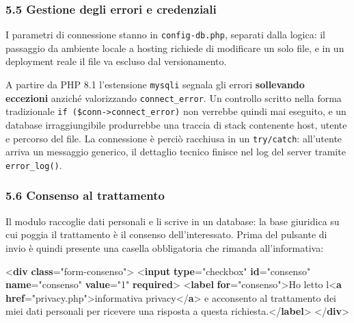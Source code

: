 \documentclass[
  11pt,
]{article}
\newenvironment{Shaded}{\begin{snugshade}}{\end{snugshade}}
\newcommand{\DataTypeTok}[1]{\textcolor[rgb]{0.13,0.29,0.53}{#1}}
\newcommand{\ErrorTok}[1]{\textcolor[rgb]{0.64,0.00,0.00}{\textbf{#1}}}
\newcommand{\KeywordTok}[1]{\textcolor[rgb]{0.13,0.29,0.53}{\textbf{#1}}}
\newcommand{\NormalTok}[1]{#1}
\newcommand{\OtherTok}[1]{\textcolor[rgb]{0.56,0.35,0.01}{#1}}
\newcommand{\StringTok}[1]{\textcolor[rgb]{0.31,0.60,0.02}{#1}}
\begin{document}
\hypertarget{gestione-degli-errori-e-credenziali}{%
\subsubsection{5.5 Gestione degli errori e
credenziali}\label{gestione-degli-errori-e-credenziali}}

I parametri di connessione stanno in \texttt{config-db.php}, separati
dalla logica: il passaggio da ambiente locale a hosting richiede di
modificare un solo file, e in un deployment reale il file va escluso dal
versionamento.

A partire da PHP 8.1 l'estensione \texttt{mysqli} segnala gli errori
\textbf{sollevando eccezioni} anziché valorizzando
\texttt{connect\_error}. Un controllo scritto nella forma tradizionale
\texttt{if\ (\$conn-\textgreater{}connect\_error)} non verrebbe quindi
mai eseguito, e un database irraggiungibile produrrebbe una traccia di
stack contenente host, utente e percorso del file. La connessione è
perciò racchiusa in un \texttt{try/catch}: all'utente arriva un
messaggio generico, il dettaglio tecnico finisce nel log del server
tramite \texttt{error\_log()}.

\hypertarget{consenso-al-trattamento}{%
\subsubsection{5.6 Consenso al
trattamento}\label{consenso-al-trattamento}}

Il modulo raccoglie dati personali e li scrive in un database: la base
giuridica su cui poggia il trattamento è il consenso dell'interessato.
Prima del pulsante di invio è quindi presente una casella obbligatoria
che rimanda all'informativa:

\begin{Shaded}
\begin{Highlighting}[]
\DataTypeTok{\textless{}}\KeywordTok{div} \ErrorTok{class}\OtherTok{=}\StringTok{"form{-}consenso"}\DataTypeTok{\textgreater{}}
  \DataTypeTok{\textless{}}\KeywordTok{input} \ErrorTok{type}\OtherTok{=}\StringTok{"checkbox"} \ErrorTok{id}\OtherTok{=}\StringTok{"consenso"} \ErrorTok{name}\OtherTok{=}\StringTok{"consenso"} \ErrorTok{value}\OtherTok{=}\StringTok{"1"} \ErrorTok{required}\DataTypeTok{\textgreater{}}
  \DataTypeTok{\textless{}}\KeywordTok{label} \ErrorTok{for}\OtherTok{=}\StringTok{"consenso"}\DataTypeTok{\textgreater{}}\NormalTok{Ho letto l\textquotesingle{}}\DataTypeTok{\textless{}}\KeywordTok{a} \ErrorTok{href}\OtherTok{=}\StringTok{"privacy.php"}\DataTypeTok{\textgreater{}}\NormalTok{informativa}
\NormalTok{    privacy}\DataTypeTok{\textless{}/}\KeywordTok{a}\DataTypeTok{\textgreater{}}\NormalTok{ e acconsento al trattamento dei miei dati personali}
\NormalTok{    per ricevere una risposta a questa richiesta.}\DataTypeTok{\textless{}/}\KeywordTok{label}\DataTypeTok{\textgreater{}}
\DataTypeTok{\textless{}/}\KeywordTok{div}\DataTypeTok{\textgreater{}}
\end{Highlighting}
\end{Shaded}
\end{document}
